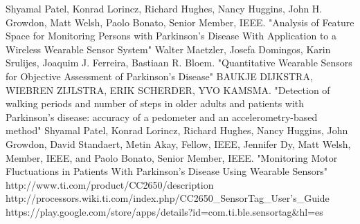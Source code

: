 \documentclass[11pt,spanish]{article}
\begin{document}
\newpage
\begin{thebibliography}{10}
    Shyamal Patel, Konrad Lorincz, Richard Hughes, Nancy Huggins, John H. Growdon, Matt Welsh, Paolo 		Bonato, Senior Member, IEEE. "Analysis of Feature Space for Monitoring Persons with Parkinson’s
	Disease With Application to a Wireless Wearable Sensor System"
    Walter Maetzler, Josefa Domingos, Karin Srulijes, Joaquim J. Ferreira, Bastiaan R. Bloem.       	     "Quantitative Wearable Sensors for Objective Assessment of Parkinson’s Disease"
    BAUKJE DIJKSTRA, WIEBREN ZIJLSTRA, ERIK SCHERDER, YVO KAMSMA. "Detection of walking periods and 	     number of steps in older adults and patients with Parkinson’s disease: accuracy of a pedometer and       an accelerometry-based method"
    Shyamal Patel, Konrad Lorincz, Richard Hughes, Nancy Huggins, John Growdon, David Standaert, Metin       Akay, Fellow, IEEE, Jennifer Dy, Matt Welsh, Member, IEEE, and Paolo Bonato, Senior Member, IEEE.       "Monitoring Motor Fluctuations in Patients With Parkinson’s Disease Using Wearable Sensors"
     http://www.ti.com/product/CC2650/description
     http://processors.wiki.ti.com/index.php/CC2650\_SensorTag\_User's\_Guide
     https://play.google.com/store/apps/details?id=com.ti.ble.sensortag\&hl=es
\end{thebibliography}
\end{document}
